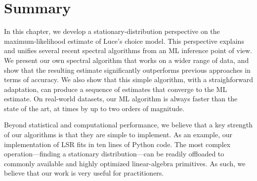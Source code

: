 \section{Summary}
\label{fi:sec:summary}

In this chapter, we develop a stationary-distribution perspective on the maximum-likelihood estimate of Luce's choice model.
This perspective explains and unifies several recent spectral algorithms from an ML inference point of view.
We present our own spectral algorithm that works on a wider range of data, and show that the resulting estimate significantly outperforms previous approaches in terms of accuracy.
We also show that this simple algorithm, with a straighforward adaptation, can produce a sequence of estimates that converge to the ML estimate.
On real-world datasets, our ML algorithm is always faster than the state of the art, at times by up to two orders of magnitude.

Beyond statistical and computational performance, we believe that a key strength of our algorithms is that they are simple to implement.
As an example, our implementation of LSR fits in ten lines of Python code.
The most complex operation---finding a stationary distribution---can be readily offloaded to commonly available and highly optimized linear-algebra primitives.
As such, we believe that our work is very useful for practitioners.
